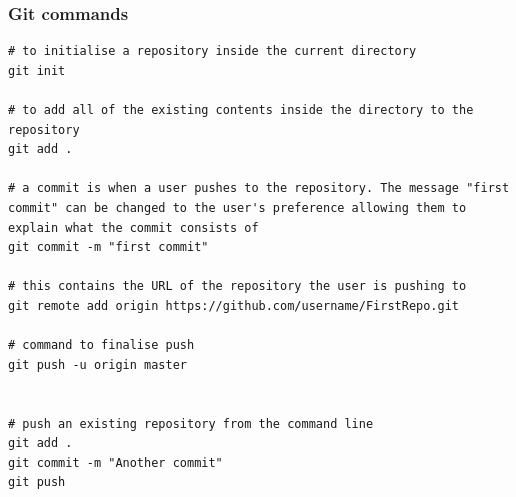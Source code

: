 \subsubsection{Git commands}
\begin{verbatim}
# to initialise a repository inside the current directory
git init

# to add all of the existing contents inside the directory to the repository
git add .

# a commit is when a user pushes to the repository. The message "first commit" can be changed to the user's preference allowing them to explain what the commit consists of
git commit -m "first commit"

# this contains the URL of the repository the user is pushing to
git remote add origin https://github.com/username/FirstRepo.git 

# command to finalise push
git push -u origin master


# push an existing repository from the command line
git add .
git commit -m "Another commit"
git push

\end{verbatim}

